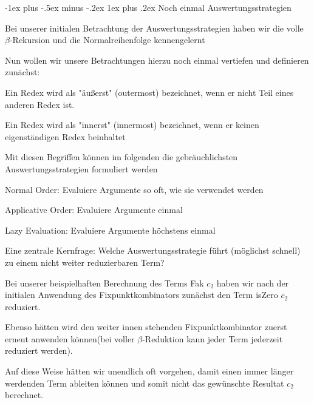 \documentclass[10pt]{article}
\makeatletter
\renewcommand{\subsubsection}{\@startsection{subsubsection}{3}{0mm}%
                                {-1ex plus -.5ex minus -.2ex}%
                                {1ex plus .2ex}%
                                {\normalfont\small\bfseries}}
\makeatother
\begin{document}
  \subsubsection{Noch einmal Auswertungsstrategien}
  \begin{itemize*}
    \item Bei unserer initialen Betrachtung der Auswertungsstrategien haben wir die volle $\beta$-Rekursion und die Normalreihenfolge kennengelernt
    \item Nun wollen wir unsere Betrachtungen hierzu noch einmal vertiefen und definieren zunächst:
    \begin{itemize*}
      \item Ein Redex wird als \color{blue} "äußerst" (outermost) \color{black} bezeichnet, wenn er nicht Teil eines anderen Redex ist.
      \item Ein Redex wird als \color{blue} "innerst" (innermost) \color{black} bezeichnet, wenn er keinen eigenständigen Redex beinhaltet
    \end{itemize*}
    \item Mit diesen Begriffen können im folgenden die gebräuchlichsten Auswertungsstrategien formuliert werden
    \begin{itemize*}
      \item \color{blue} Normal Order: \color{black} Evaluiere Argumente so oft, wie sie verwendet werden
      \item \color{blue} Applicative Order: \color{black} Evaluiere Argumente einmal
      \item \color{blue} Lazy Evaluation: \color{black} Evaluiere Argumente höchstens einmal
    \end{itemize*}
    \item Eine zentrale Kernfrage: \color{blue} Welche Auswertungsstrategie führt (möglichst schnell) zu einem nicht weiter reduzierbaren Term?
    \color{black}
    \begin{itemize*}
      \item Bei unserer beispielhaften Berechnung des Terms Fak $c_2$ haben wir nach der initialen Anwendung des Fixpunktkombinators zunächst den Term isZero $c_2$ reduziert.
      \item Ebenso hätten wird den weiter innen stehenden Fixpunktkombinator zuerst erneut anwenden können(bei voller $\beta$-Reduktion kann jeder Term jederzeit reduziert werden).
      \item Auf diese Weise hätten wir unendlich oft vorgehen, damit einen immer länger werdenden Term ableiten können und somit nicht das gewünschte Resultat $c_2$ berechnet.

\end{itemize*}
\end{itemize*}
\end{document}
